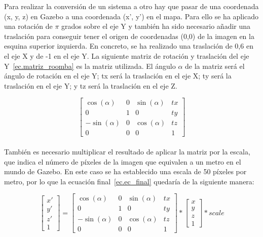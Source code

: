Para realizar la conversión de un sistema a otro hay que pasar de una coordenada (x, y, z) en Gazebo a una coordenada (x', y') en el mapa. Para ello se ha aplicado una rotación de \(\pi\) grados sobre el eje Y y también ha sido necesario añadir una traslación para conseguir tener el origen de coordenadas (0,0) de la imagen en la esquina superior izquierda. En concreto, se ha realizado una traslación de 0,6 en el eje X y de -1 en el eje Y. La siguiente matriz de rotación y traslación del eje Y~\ref{ec.matriz_roomba} es la matriz utilizada. El ángulo \(\alpha\) de la matriz será el ángulo de rotación en el eje Y; tx será la traslación en el eje X; ty será la traslación en el eje Y; y tz será la traslación en el eje Z. 

\begin{equation}
\label{ec.matriz_roomba}
\left[\begin{array}{cccc}
\cos(\alpha) & 0 & \sin(\alpha) & tx \\ 
0 & 1 & 0 & ty\\
-\sin(\alpha) & 0 & \cos(\alpha) & tz \\
0 & 0 & 0 & 1
\end{array}\right]
\end{equation}
\\


También es necesario multiplicar el resultado de aplicar la matriz por la escala, que indica el número de píxeles de la imagen que equivalen a un metro en el mundo de Gazebo. En este caso se ha establecido una escala de 50 píxeles por metro, por lo que la ecuación final~\ref{ec.ec_final} quedaría de la siguiente manera:

\begin{equation}
\label{ec.ec_final}
\left[\begin{array}{cc}
x' \\ 
y' \\
z' \\
1
\end{array}\right] = \left[\begin{array}{cccc}
\cos(\alpha) & 0 & \sin(\alpha) & tx \\ 
0 & 1 & 0 & ty\\
-\sin(\alpha) & 0 & \cos(\alpha) & tz \\
0 & 0 & 0 & 1
\end{array}\right]* \left[\begin{array}{cc}
x \\ 
y \\
z \\
1
\end{array}\right]*scale
\end{equation}


